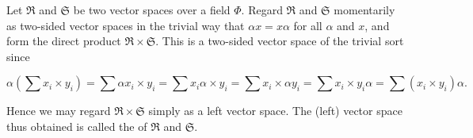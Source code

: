 Let $\Re$ and $\mathfrak{S}$ be two vector spaces over a field $\Phi$. Regard $\Re$ and $\mathfrak{S}$ momentarily as two-sided vector spaces in the trivial way that $\alpha x = x\alpha$ for all $\alpha$ and $x$, and form the direct product $\Re \times \mathfrak{S}$. This is a two-sided vector space of the trivial sort since

$$\alpha\left(\sum x_i \times y_i\right) = \sum \alpha x_i \times y_i = \sum x_i \alpha \times y_i = \sum x_i \times \alpha y_i = \sum x_i \times y_i \alpha = \sum (x_i \times y_i)\alpha.$$

Hence we may regard $\Re \times \mathfrak{S}$ simply as a left vector space. The (left) vector space thus obtained is called the  of $\Re$ and $\mathfrak{S}$.

